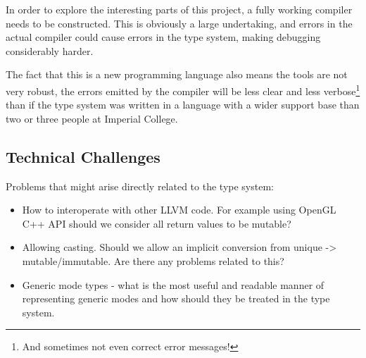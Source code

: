 \documentclass{article}
\begin{document}
In order to explore the interesting parts of this project, a fully working compiler needs to be constructed. This is obviously a large undertaking, and errors in the actual compiler could cause errors in the type system, making debugging considerably harder.

The fact that this is a new programming language also means the tools are not very robust, the errors emitted by the compiler will be less clear and less verbose\footnote{And sometimes not even correct error messages!} than if the type system was written in a language with a wider support base than two or three people at Imperial College.

\subsection{Technical Challenges}

Problems that might arise directly related to the type system:
	\begin{itemize}
		\item How to interoperate with other LLVM code. For example using OpenGL C++ API should we consider all return values to be mutable? 
		\item Allowing casting. Should we allow an implicit conversion from unique -> mutable/immutable. Are there any problems related to this?
		\item Generic mode types - what is the most useful and readable manner of representing generic modes and how should they be treated in the type system.
	\end{itemize}
\end{document}
